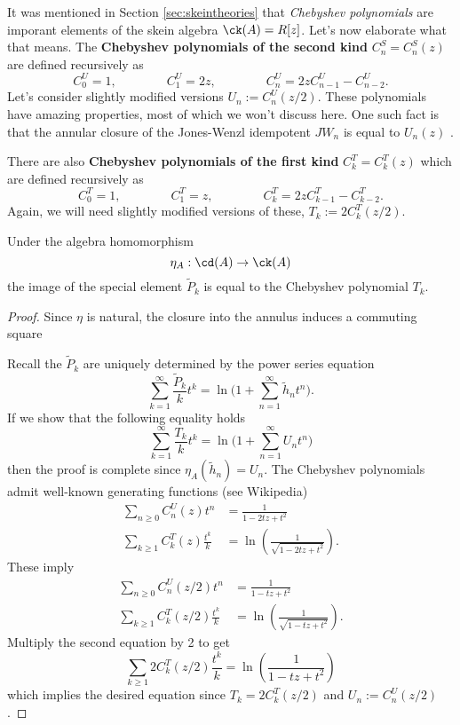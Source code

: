 It was mentioned in Section \ref{sec:skeintheories} that \textit{Chebyshev polynomials} are imporant elements of the skein algebra $\ck(A) = R[z]$. Let's now elaborate what that means. The 
\textbf{Chebyshev polynomials of the second kind} $C^S_n = C^S_n(z)$ are defined recursively as
\[
C^U_0 = 1, \qquad \qquad C^U_1 = 2z, \qquad \qquad C^U_n = 2 z C^U_{n-1} - C^U_{n-2}.
\]
Let's consider slightly modified versions $U_n := C_n^U(z/2)$. These polynomials have amazing properties, most of which we won't discuss here. One such fact is that the annular closure of the Jones-Wenzl idempotent $JW_n$ is equal to $U_n(z)$ . 

There are also \textbf{Chebyshev polynomials of the first kind} $C^T_k = C^T_k(z)$ which are defined recursively as
\[
C^T_0 = 1, \qquad \qquad C^T_1 = z, \qquad \qquad C^T_k = 2 z C^T_{k-1} - C^T_{k-2}.
\]
Again, we will need slightly modified versions of these, $T_k := 2C^T_k(z/2)$.  

\begin{corollary}
Under the algebra homomorphism
\[
\eta_A: \cd(A) \to \ck(A)
\]
the image of the special element $\tilde{P}_k$ is equal to the Chebyshev polynomial $T_k$.
\end{corollary}
\begin{proof}
Since $\eta$ is natural, the closure into the annulus induces a commuting square
\begin{center}
\end{center}
Recall the $\tilde{P}_k$ are uniquely determined by the power series equation
\[
\sum_{k=1}^\infty \frac{\tilde{P}_k}{k} t^k = \ln \Bigg( 1 + \sum_{n=1}^\infty \tilde{h}_n t^n \Bigg).
\]
If we show that the following equality holds
\[
\sum_{k=1}^\infty \frac{T_k}{k} t^k = \ln \Bigg( 1 + \sum_{n=1}^\infty U_n t^n \Bigg)
\]
then the proof is complete since $\eta_A(\tilde{h}_n)=U_n$. The Chebyshev polynomials admit well-known generating functions (see Wikipedia)
\begin{align*}
\sum_{n \geq 0} C_n^U(z)t^n &= \frac{1}{1-2tz+t^2} \\
\sum_{k \geq 1} C_k^T(z)\frac{t^k}{k} &= \ln \left( \frac{1}{\sqrt{1-2tz+t^2}} \right).
\end{align*}
These imply
\begin{align*}
\sum_{n \geq 0} C_n^U(z/2)t^n &= \frac{1}{1-tz+t^2} \\
\sum_{k \geq 1} C_k^T(z/2)\frac{t^k}{k} &= \ln \left( \frac{1}{\sqrt{1-tz+t^2}} \right).
\end{align*}
Multiply the second equation by 2 to get
\[
\sum_{k \geq 1} 2C_k^T(z/2)\frac{t^k}{k} = \ln \left( \frac{1}{1-tz+t^2} \right)
\]
which implies the desired equation since $T_k = 2C_k^T(z/2)$ and $U_n := C_n^U(z/2)$.
\end{proof}

